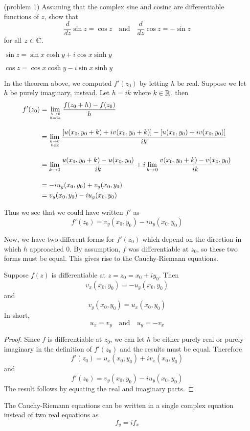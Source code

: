 \documentclass[handout]{ximera}
\begin{document}
\begin{problem}(problem 1)
Assuming that the complex sine and cosine are differentiable functions of $z$, show that
\[
\frac{d}{dz} \sin z = \cos z \quad \mbox{and} \quad \frac{d}{dz} \cos z = -\sin z
\]
for all $z \in \mathbb C$.
\begin{hint}
$\sin z = \sin x \cosh y + i \cos x \sinh y$
\end{hint}
\begin{hint}
$\cos z = \cos x \cosh y - i \sin x \sinh y$
\end{hint}
\end{problem}


In the theorem above, we computed $f'(z_0)$ by letting $h$ be real.  
Suppose we let $h$ be purely imaginary, instead.
Let $h = ik$ where $k \in \mathbb R$, then
\begin{align*}
f'(z_0) &= \lim_{h \to 0 \atop h = ik} \frac{f(z_0 + h) -f(z_0)}{h} \\[10pt]
        &= \lim_{k \to 0 \atop k \in \mathbb R} \frac{\left[u(x_0 , y_0+k) + iv(x_0 , y_0+k)\right] -
         \left[u(x_0,y_0)+iv(x_0, y_0)\right]}{ik} \\[10pt]
        &=  \lim_{k \to 0} \frac{u(x_0 , y_0+k)- u(x_0,y_0)}{ik} +
        i\lim_{k \to 0}\frac{v(x_0 , y_0+k)-v(x_0, y_0)}{ik} \\[10pt]
        &= -iu_y(x_0,y_0) + v_y(x_0,y_0)\\
        &=  v_y(x_0,y_0)-iu_y(x_0,y_0)
\end{align*}

Thus we see that we could have written $f'$ as
\[
f'(z_0) = v_y(x_0,y_0)-iu_y(x_0,y_0)
\]

Now, we have two different forms for $f'(z_0)$ which depend on the direction in which $h$ approached $0$.
By assumption, $f$ was differentiable at $z_0$, so these two forms must be equal. 
This gives rise to the Cauchy-Riemann equations.


\begin{theorem}
Suppose $f(z)$ is differentiable at $z = z_0 = x_0 +iy_0$. Then
\[
v_x(x_0,y_0)= -u_y(x_0,y_0) 
\]
and 
\[
v_y(x_0,y_0) = u_x(x_0,y_0)
\]
In short, 
\[
u_x =v_y \quad \mbox{and} \quad u_y = -v_x
\]
\end{theorem}


\begin{proof}
Since $f$ is differentiable at $z_0$, we can let $h$ be either purely real or 
purely imaginary in the definition of $f'(z_0)$
and the results must be equal. Therefore
\[
f'(z_0) = u_x(x_0,y_0)+iv_x(x_0,y_0)
\]
and
\[
f'(z_0) = v_y(x_0,y_0)-iu_y(x_0,y_0)
\]
The result follows by equating the real and imaginary parts.
\end{proof}
\begin{remark}
The Cauchy-Riemann equations can be written in a single complex equation instead of two real equations as
\[
f_y = if_x
\]
\end{remark}
\end{document}
